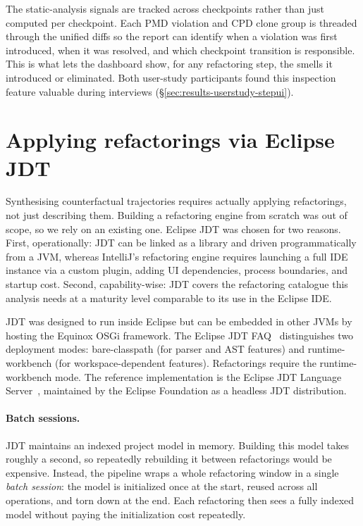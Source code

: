 The static-analysis signals are tracked across checkpoints rather than just computed per checkpoint. Each PMD violation and CPD clone group is threaded through the unified diffs so the report can identify when a violation was first introduced, when it was resolved, and which checkpoint transition is responsible. This is what lets the dashboard show, for any refactoring step, the smells it introduced or eliminated. Both user-study participants found this inspection feature valuable during interviews (\S\ref{sec:results-userstudy-stepui}).

\section{Applying refactorings via Eclipse JDT}
\label{sec:arch-jdt}

Synthesising counterfactual trajectories requires actually applying refactorings, not just describing them. Building a refactoring engine from scratch was out of scope, so we rely on an existing one. Eclipse JDT was chosen for two reasons. First, operationally: JDT can be linked as a library and driven programmatically from a JVM, whereas IntelliJ's refactoring engine requires launching a full IDE instance via a custom plugin, adding UI dependencies, process boundaries, and startup cost. Second, capability-wise: JDT covers the refactoring catalogue this analysis needs at a maturity level comparable to its use in the Eclipse IDE.

JDT was designed to run inside Eclipse but can be embedded in other JVMs by hosting the Equinox OSGi framework. The Eclipse JDT FAQ~\cite{eclipse_jdt_faq} distinguishes two deployment modes: bare-classpath (for parser and AST features) and runtime-workbench (for workspace-dependent features). Refactorings require the runtime-workbench mode. The reference implementation is the Eclipse JDT Language Server~\cite{eclipse_jdtls}, maintained by the Eclipse Foundation as a headless JDT distribution.

\paragraph{Batch sessions.}
JDT maintains an indexed project model in memory. Building this model takes roughly a second, so repeatedly rebuilding it between refactorings would be expensive. Instead, the pipeline wraps a whole refactoring window in a single \emph{batch session}: the model is initialized once at the start, reused across all operations, and torn down at the end. Each refactoring then sees a fully indexed model without paying the initialization cost repeatedly.

